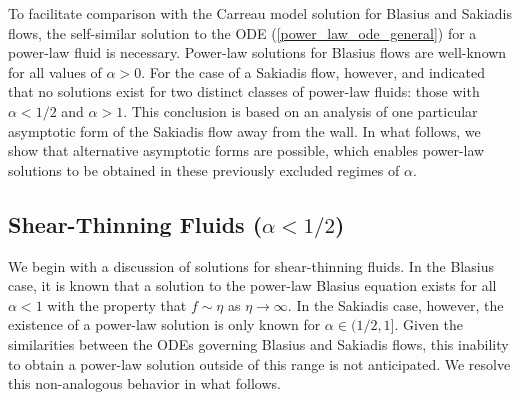 \documentclass{article}
\begin{document}
\hspace{\parindent} To facilitate comparison with the Carreau model solution for Blasius and Sakiadis flows, the self-similar solution to the ODE (\ref{power_law_ode_general}) for a power-law fluid is necessary. Power-law solutions for Blasius flows are well-known for all values of $\alpha>0$. For the case of a Sakiadis flow, however, \cite{Fox} and \cite{NonNewtonian} indicated that no solutions exist for two distinct classes of power-law fluids: those with $\alpha < 1/2$ and $\alpha > 1$. This conclusion is based on an analysis of one particular asymptotic form of the Sakiadis flow away from the wall. In what follows, we show that alternative asymptotic forms are possible, which enables power-law solutions to be obtained in these previously excluded regimes of $\alpha$.

\subsection{Shear-Thinning Fluids ($\alpha < 1/2$)}


We begin with a discussion of solutions for shear-thinning fluids.  In the Blasius case, it is known that a solution to the power-law Blasius equation exists for all $\alpha < 1$ with the property that $f \sim \eta$ as $\eta \to \infty$. In the Sakiadis case, however, the existence of a power-law solution is only known for $\alpha \in (1/2, 1]$.  Given the similarities between the ODEs governing Blasius and Sakiadis flows, this inability to obtain a power-law solution outside of this range is not anticipated.  We resolve this non-analogous behavior in what follows.
\end{document}
